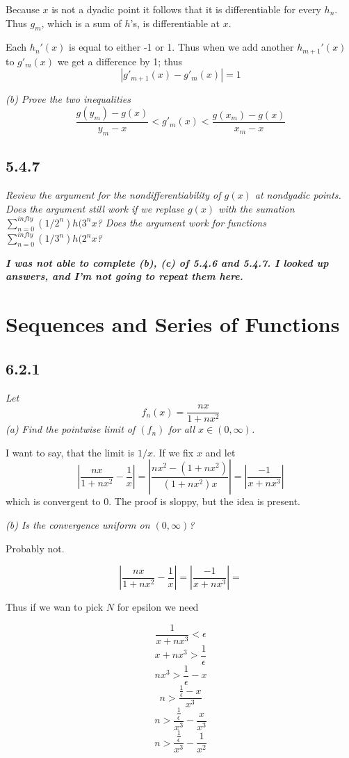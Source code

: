 \documentclass[11pt,oneside,titlepage]{book}
\begin{document}
Because $x$ is not a dyadic point it follows that it is differentiable for
every $h_n$. Thus $g_m$, which is a sum of $h$'s, is differentiable at $x$.

Each $h_n'(x)$ is equal to either -1 or 1. Thus when we add another
$h_{m + 1}'(x)$ to $g'_m(x)$ we get a difference by 1; thus
$$|g'_{m + 1}(x) - g'_m(x)| = 1$$

\textit{(b) Prove the two inequalities}
$$\frac{g(y_m) - g(x)}{y_m - x} < g'_m(x) < \frac{g(x_m) - g(x)}{x_m - x}$$

\section*{5.4.7}
\textit{Review the argument for the nondifferentiability of $g(x)$ at
  nondyadic points. Does the argument still work if we replase $g(x)$ with
  the sumation $\sum_{n =0}^{infty}{(1/2^n)h(3^n x}$? Does the argument work
  for functions $\sum_{n =0}^{infty}{(1/3^n)h(2^n x}$?}


\textbf{\textit{I was not able to complete (b), (c) of 5.4.6 and 5.4.7.
    I looked up answers, and I'm not going to repeat them here.}}

\chapter{Sequences and Series of Functions}

\section*{6.2.1}
\textit{Let}
$$f_n(x) = \frac{nx}{1 + nx^2}$$
\textit{(a) Find the pointwise limit of $(f_n)$ for all $x \in (0, \infty)$.}

I want to say, that the limit is $1/x$. If we fix $x$ and
let
$$\left|\frac{nx}{1 + nx^2} - \frac{1}{x}\right| =
\left|\frac{nx^2 - (1 + nx^2)}{(1 + nx^2)x} \right| =
\left|\frac{-1}{x + nx^3} \right|
$$
which is convergent to 0. The proof is sloppy, but the idea is present.

\textit{(b) Is the convergence uniform on $(0, \infty)$?}

Probably not.

$$\left|\frac{nx}{1 + nx^2} - \frac{1}{x}\right| =
\left|\frac{-1}{x + nx^3} \right| =
$$

Thus if we wan to pick $N$ for epsilon we need

$$\frac{1}{x + nx^3} < \epsilon$$
$$x + nx^3 > \frac{1}{\epsilon}$$
$$nx^3 > \frac{1}{\epsilon} - x$$
$$n > \frac{\frac{1}{\epsilon} - x}{x^3}$$
$$n > \frac{\frac{1}{\epsilon}}{x^3} - \frac{x}{x^3}$$
$$n > \frac{\frac{1}{\epsilon}}{x^3} - \frac{1}{x^2}$$
\end{document}
